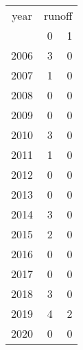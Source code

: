 \footnotesize\begin{tabular}[t]{lrr}
\toprule
\multicolumn{1}{c}{year} & \multicolumn{2}{c}{runoff} \\
\cmidrule(l{3pt}r{3pt}){1-1} \cmidrule(l{3pt}r{3pt}){2-3}
  & 0 & 1\\
\midrule
2006 & 3 & 0\\
2007 & 1 & 0\\
2008 & 0 & 0\\
2009 & 0 & 0\\
2010 & 3 & 0\\
2011 & 1 & 0\\
2012 & 0 & 0\\
2013 & 0 & 0\\
2014 & 3 & 0\\
2015 & 2 & 0\\
2016 & 0 & 0\\
2017 & 0 & 0\\
2018 & 3 & 0\\
2019 & 4 & 2\\
2020 & 0 & 0\\
\bottomrule
\end{tabular}
